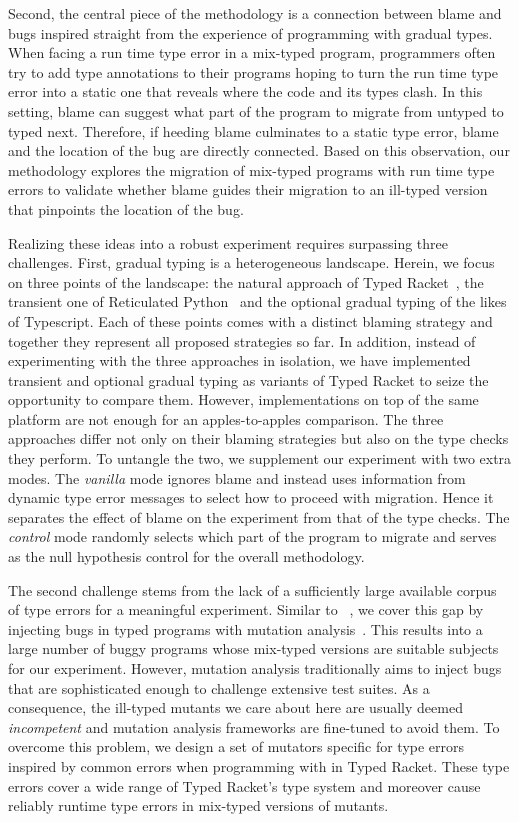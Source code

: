 Second, the central piece of the methodology is a connection between blame
and bugs inspired straight from the experience of programming with gradual
types.  When facing a run time type error in a mix-typed program, programmers often try to add
type annotations to their programs hoping to turn the  run time type error
into a static one that reveals where the code and its types clash.  In
this setting, blame can suggest what part of the program to migrate from
untyped to typed next.  Therefore, if heeding blame culminates to a static type
error, blame and the location of the bug are directly connected.  Based on
this observation, our methodology explores the migration of mix-typed programs with
run time type errors to validate whether blame guides their migration to an
ill-typed  version that pinpoints the location of the
bug.

Realizing these ideas into a robust experiment requires surpassing three challenges.  First,
gradual typing is a heterogeneous landscape. Herein, we focus on three
points of the landscape: the natural approach of Typed
Racket~\cite{tf-dls-2006,tf-popl-2008,tfffgksst-snapl-2017,tf-icfp-2010},
the transient one of Reticulated
Python~\cite{vsc-dls-2019,vss-popl-2017,vksb-dls-2014} and  the optional
gradual typing of the likes of Typescript. Each of these points comes with
a distinct blaming strategy and together they represent all proposed
strategies so far. In addition, instead of experimenting with the three
approaches in isolation, we have implemented transient and optional
gradual typing as variants of  Typed Racket to seize the opportunity to
compare them.  However, implementations on top of the same platform are
not enough for an apples-to-apples comparison. The three approaches differ
not only on their blaming strategies but also on the type checks they
perform. To untangle the two, we supplement our experiment with two extra
modes. The \emph{vanilla} mode  ignores blame and instead uses information
from dynamic type error messages to select how to proceed with migration. Hence it
separates the effect of blame on the experiment from that of the type
checks. The \emph{control} mode randomly selects which part of the program to migrate
and serves as the null hypothesis control for the overall methodology.  


The second challenge stems from the lack of a sufficiently large available
corpus of type errors for a meaningful experiment. Similar to
~\citet{lksfd-popl-2020}, we cover this gap by injecting bugs in
typed programs  with mutation analysis~\cite{lipton1971fault,
demillo1978hints, jia2011analysis}. This results into a large 
number of buggy programs whose mix-typed versions are suitable subjects
for our experiment. However, mutation analysis
traditionally  aims to inject bugs that are sophisticated enough to
challenge extensive test suites. As a consequence, the ill-typed mutants we care about here are
usually deemed \emph{incompetent} and mutation analysis frameworks are
fine-tuned to avoid them. To overcome this problem, we design a
set of mutators specific for type errors inspired by common errors when
programming with in Typed Racket.  These type errors cover
a wide range of Typed Racket's type system and moreover cause reliably runtime
type errors  in mix-typed versions of mutants.

